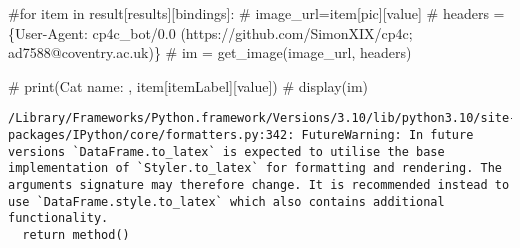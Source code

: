 \documentclass[
  letterpaper,
  DIV=11,
  numbers=noendperiod]{scrreprt}
\newenvironment{Shaded}{\begin{snugshade}}{\end{snugshade}}
\newcommand{\CommentTok}[1]{\textcolor[rgb]{0.37,0.37,0.37}{#1}}
\begin{document}
\begin{Shaded}
\begin{Highlighting}[]
\CommentTok{\#for item in result[\textquotesingle{}results\textquotesingle{}][\textquotesingle{}bindings\textquotesingle{}]:}
    \CommentTok{\# image\_url=item[\textquotesingle{}pic\textquotesingle{}][\textquotesingle{}value\textquotesingle{}]}
    \CommentTok{\# headers = \{\textquotesingle{}User{-}Agent\textquotesingle{}: \textquotesingle{}cp4c\_bot/0.0 (https://github.com/SimonXIX/cp4c; ad7588@coventry.ac.uk)\textquotesingle{}\}}
    \CommentTok{\# im = get\_image(image\_url, headers)}

    \CommentTok{\# print(\textquotesingle{}Cat name: \textquotesingle{}, item[\textquotesingle{}itemLabel\textquotesingle{}][\textquotesingle{}value\textquotesingle{}])}
    \CommentTok{\# display(im)}
\end{Highlighting}
\end{Shaded}

\begin{verbatim}
/Library/Frameworks/Python.framework/Versions/3.10/lib/python3.10/site-packages/IPython/core/formatters.py:342: FutureWarning: In future versions `DataFrame.to_latex` is expected to utilise the base implementation of `Styler.to_latex` for formatting and rendering. The arguments signature may therefore change. It is recommended instead to use `DataFrame.style.to_latex` which also contains additional functionality.
  return method()
\end{verbatim}
\end{document}
